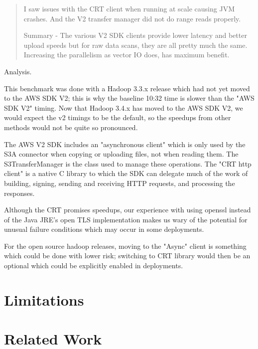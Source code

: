 \documentclass[manuscript]{acmart}
\begin{document}
\begin{quotation}

I saw issues with the CRT client when running at scale causing JVM crashes.
And the V2 transfer manager did not do range reads properly.

Summary - The various V2 SDK clients provide lower latency and better upload speeds but for raw data scans,
they are all pretty much the same.
Increasing the parallelism as vector IO does, has maximum benefit.
\end{quotation}

Analysis.

This benchmark was done with a Hadoop 3.3.x release which had not yet moved to
the AWS SDK V2; this is why the baseline 10:32 time is slower than the "AWS SDK V2"
timing.
Now that Hadoop 3.4.x has moved to the AWS SDK V2, we would expect the v2 timings to
be the default, so the speedups from other methods would not be quite so pronounced.

The AWS V2 SDK includes an "asynchronous client" which is only used by the S3A
connector when copying or uploading files, not when reading them.
The S3TransferManager is the class used to manage these operations.
The "CRT http client" is a native C library to which the SDK can delegate much
of the work of building, signing, sending and receiving HTTP requests, and processing
the responses.

Although the CRT promises speedups, our experience with using openssl instead of
the Java JRE's open TLS implementation makes us wary of the potential for
unusual failure conditions which may occur in some deployments.

For the open source hadoop releases, moving to the "Async" client is something
which could be done with lower risk; switching to CRT library would then be
an optional which could be explicitly enabled in deployments.


\section{Limitations}
\label{sec:limitations}


\section{Related Work}
\label{sec:related-work}
\end{document}

